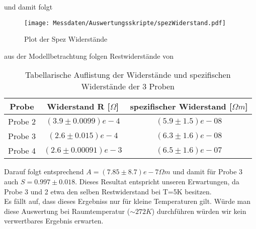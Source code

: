     und damit folgt
    \begin{figure}[H]
        \centering
        \texttt{[image: Messdaten/Auswertungsskripte/spezWiderstand.pdf]}
        \caption{Plot der Spez Widerstände}
        \label{spec resistance plot}
    \end{figure}
    aus der Modellbetrachtung folgen Restwiderstände von
    \begin{table}[H]
        \centering
        \begin{tabular}{c|c|c}
            Probe & Widerstand R [$\Omega$] &spezifischer Widerstand [$\Omega m$] \\
            \hline
            Probe 2 & $(3.9\pm 0.0099)e-4 $ & $(5.9\pm 1.5)e-08$ \\
            Probe 3 & $(2.6\pm 0.015)e-4 $ & $(6.3\pm 1.6)e-08$ \\
            Probe 4 & $(2.6\pm 0.00091)e-3 $ & $(6.5\pm 1.6)e-07$ \\
        \end{tabular}
        \caption{Tabellarische Auflistung der Widerstände und spezifischen Widerstände der 3 Proben}
    \end{table}
    Darauf folgt entsprechend $A=(7.85\pm8.7)e-7 \Omega m$ und damit für Probe 3 auch $S=0.997 \pm 0.018$. Dieses Resultat
    entspricht unseren Erwartungen, da Probe 3 und 2 etwa den selben Restwiderstand bei T=5K besitzen.\\
    Es fällt auf, dass dieses Ergebniss nur für kleine Temperaturen gilt. Würde man diese Auswertung bei
    Raumtemperatur ($\sim 272K$) durchführen würden wir kein verwertbares Ergebnis erwarten.%
